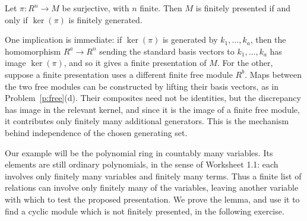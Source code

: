 \documentclass[12pt,reqno]{amsart}
\begin{document}
\begin{lemma}
Let $\pi:R^n\to M$ be surjective, with $n$ finite. Then $M$ is finitely presented if and only if $\ker(\pi)$ is finitely generated.
\end{lemma}

One implication is immediate: if $\ker(\pi)$ is generated by $k_1,\ldots,k_a$, then the homomorphism $R^a\to R^n$ sending the standard basis vectors to $k_1,\ldots,k_a$ has image $\ker(\pi)$, and so it gives a finite presentation of $M$. For the other, suppose a finite presentation uses a different finite free module $R^b$. Maps between the two free modules can be constructed by lifting their basis vectors, as in Problem~\ref{p:free}(d). Their composites need not be identities, but the discrepancy has image in the relevant kernel, and since it is the image of a finite free module, it contributes only finitely many additional generators. This is the mechanism behind independence of the chosen generating set.

Our example will be the polynomial ring in countably many variables. Its elements are still ordinary polynomials, in the sense of Worksheet 1.1: each involves only finitely many variables and finitely many terms. Thus a finite list of relations can involve only finitely many of the variables, leaving another variable with which to test the proposed presentation. We prove the lemma, and use it to find a cyclic module which is not finitely presented, in the following exercise.

\hrulefill
\end{document}
